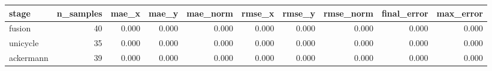 \begin{tabular}{lrrrrrrrrr}
\hline
stage & n\_samples & mae\_x & mae\_y & mae\_norm & rmse\_x & rmse\_y & rmse\_norm & final\_error & max\_error \\
\hline
fusion & 40 & 0.000 & 0.000 & 0.000 & 0.000 & 0.000 & 0.000 & 0.000 & 0.000 \\
unicycle & 35 & 0.000 & 0.000 & 0.000 & 0.000 & 0.000 & 0.000 & 0.000 & 0.000 \\
ackermann & 39 & 0.000 & 0.000 & 0.000 & 0.000 & 0.000 & 0.000 & 0.000 & 0.000 \\
\hline
\end{tabular}